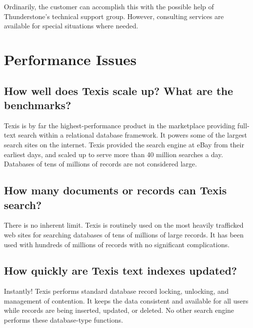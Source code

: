 Ordinarily, the customer can accomplish this with the possible help of
Thunderstone's technical support group.  However, consulting services
are available for special situations where needed.

\chapter{Performance Issues}

\section{How well does Texis scale up? What are the benchmarks? }

Texis is by far the highest-performance product in the marketplace
providing full-text search within a relational database framework.  It
powers some of the largest search sites on the internet.  Texis
provided the search engine at eBay from their earliest days, and
scaled up to serve more than 40 million searches a day. Databases of
tens of millions of records are not considered large.

\section{How many documents or records can Texis search? }

There is no inherent limit.  Texis is routinely used on the most
heavily trafficked web sites for searching databases of tens of
millions of large records.  It has been used with hundreds of millions
of records with no significant complications.

\section{How quickly are Texis text indexes updated? }

Instantly!  Texis performs standard database record locking,
unlocking, and management of contention.  It keeps the data consistent
and available for all users while records are being inserted, updated,
or deleted.  No other search engine performs these database-type
functions.

